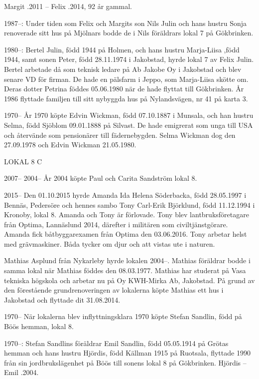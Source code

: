 Margit .2011  --  Felix .2014, 92 år gammal.


1987--:	Under tiden som Felix och Margits son Nils Julin och hans hustru Sonja renoverade sitt hus på Mjölnars bodde de i Nils föräldrars lokal 7 på Gökbrinken.

1980--:	Bertel Julin, född 1944 på Holmen, och hans hustru Marja-Liisa ,född 1944, samt sonen Peter, född 28.11.1974 i Jakobstad, hyrde lokal 7 av Felix Julin. Bertel arbetade då som teknisk ledare på Ab Jakobe Oy i Jakobstad och blev senare VD för firman. De hade en pälsfarm i Jeppo, som Marja-Liisa skötte om. Deras dotter Petrina föddes 05.06.1980 när de hade flyttat till Gökbrinken. År 1986 flyttade familjen till sitt nybyggda hus på Nylandsvägen, nr 41 på karta 3.

 1970--
År 1970 köpte Edvin Wickman, född 07.10.1887 i Munsala, och han hustru Selma, född Sjöblom 09.01.1888 på Silvast. De hade emigrerat som unga till USA och återvände som pensionärer till fädernebygden. Selma Wickman dog den 27.09.1978 och Edvin Wickman 21.05.1980.


LOKAL 8 C

 2007--
 2004--
År 2004 köpte Paul och Carita Sandström lokal 8.

	2015--
Den 01.10.2015 hyrde Amanda Ida Helena Söderbacka, född 28.05.1997 i Bennäs, Pedersöre och hennes sambo Tony Carl-Erik Björklund, född 11.12.1994 i Kronoby, lokal 8. Amanda och Tony är förlovade. Tony blev lantbruksföretagare från Optima, Lannäslund 2014, därefter i militären som civiltjänstgörare. Amanda fick båtbyggarexamen från Optima den 03.06.2016. Tony arbetar helst med grävmaskiner. Båda tycker om djur och att vistas ute i naturen.

Mathias Asplund från Nykarleby hyrde lokalen 2004--. Mathias föräldrar bodde i samma lokal när Mathias föddes den 08.03.1977. Mathias har studerat på Vasa tekniska högskola och arbetar nu på Oy KWH-Mirka Ab, Jakobstad. På grund av den förestående grundrenoveringen av lokalerna köpte Mathias ett hus i Jakobstad och flyttade dit 31.08.2014.

 1970--
När lokalerna blev inflyttningsklara 1970 köpte Stefan Sandlin, född på Böös hemman, lokal 8.

1970--:	Stefan Sandlins föräldrar Emil Sandlin, född 05.05.1914 på Grötas hemman och hans hustru Hjördis, född  Källman 1915 på Ruotsala, flyttade 1990 från sin jordbrukslägenhet på Böös till sonens lokal 8 på Gökbrinken.
Hjördis   --  Emil .2004.

